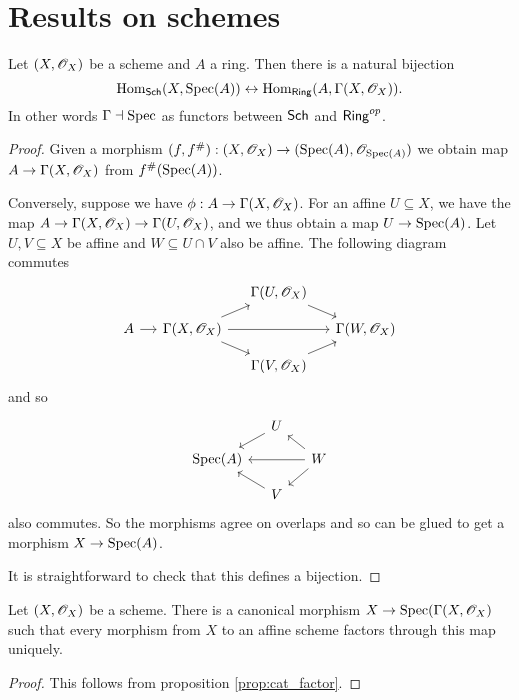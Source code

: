 \documentclass{memoir}
\begin{document}
\section{Results on schemes}
\begin{thm}
    Let $(X,\mathscr{O}_X)$ be a scheme and $A$ a ring. 
    Then there is a natural bijection
    \begin{equation}
        \operatorname{Hom}_{\normalfont\mathsf{Sch}}(X,\operatorname{Spec}(A)) \leftrightarrow \operatorname{Hom}_{\normalfont\mathsf{Ring}}(A,\Gamma(X,\mathscr{O}_X)).
    \end{equation}
    In other words $\Gamma \dashv \operatorname{Spec}$ as functors between ${\normalfont\mathsf{Sch}}$ and ${\normalfont\mathsf{Ring}}^{op}$.
\end{thm}
\begin{proof}
    Given a morphism $(f,f^\#):(X,\mathscr{O}_X) \to (\operatorname{Spec}(A),\mathscr{O}_{\operatorname{Spec}(A)})$ we obtain map $A\to \Gamma(X,\mathscr{O}_X)$ from $f^\#(\operatorname{Spec}(A))$.

    Conversely, suppose we have $\phi:A\to \Gamma(X,\mathscr{O}_X)$.
    For an affine $U\subseteq X$, we have the map $A\to \Gamma(X,\mathscr{O}_X) \to \Gamma(U,\mathscr{O}_X)$, and we thus obtain a map $U\to \operatorname{Spec}(A)$.
    Let $U,V\subseteq X$ be affine and $W\subseteq U\cap V$ also be affine.
    The following diagram commutes
    \begin{equation}
        \begin{tikzcd}[column sep=small,row sep=small]
            & & \Gamma(U,\shf{O}_X) \arrow[dr] & \\
            A \arrow[r] & \Gamma(X,\shf{O}_X) \arrow[ur] \arrow[dr] \arrow[rr] & & \Gamma(W,\shf{O}_X) \\
                        & & \Gamma(V,\shf{O}_X) \arrow[ur] &
        \end{tikzcd}
    \end{equation}
    and so 
    \begin{equation}
        \begin{tikzcd}[column sep=small,row sep=small]
                     & U \arrow[dl] & \\
            \Spec(A) & & W \arrow[dl] \arrow[ul] \arrow[ll] \\
                     & V \arrow[ul] &
        \end{tikzcd}
    \end{equation}
    also commutes.
    So the morphisms agree on overlaps and so can be glued to get a morphism $X\to \operatorname{Spec}(A)$.

    It is straightforward to check that this defines a bijection.
\end{proof}
\begin{corollary}
    Let $(X,\mathscr{O}_X)$ be a scheme. 
    There is a canonical morphism $X\to \operatorname{Spec}(\Gamma(X,\mathscr{O}_X)$ such that every morphism from $X$ to an affine scheme factors through this map uniquely.
\end{corollary}
\begin{proof}
    This follows from proposition \ref{prop:cat_factor}.
\end{proof}
\end{document}

